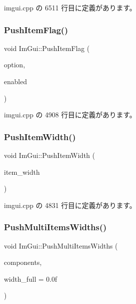  imgui.\+cpp の 6511 行目に定義があります。

\mbox{\label{namespace_im_gui_ac7301f6378333f6d17f47823eed9e00a}} 
\subsubsection{\texorpdfstring{Push\+Item\+Flag()}{PushItemFlag()}}
{\footnotesize\ttfamily void Im\+Gui\+::\+Push\+Item\+Flag (\begin{DoxyParamCaption}\item[{\mbox{\hyperlink{imgui__internal_8h_abcf9eafab4557e911b2c0d8fe2feeb38}{Im\+Gui\+Item\+Flags}}}]{option,  }\item[{bool}]{enabled }\end{DoxyParamCaption})}



 imgui.\+cpp の 4908 行目に定義があります。

\mbox{\label{namespace_im_gui_a4ad13bf38f0521a339133248ef3e3036}} 
\subsubsection{\texorpdfstring{Push\+Item\+Width()}{PushItemWidth()}}
{\footnotesize\ttfamily void Im\+Gui\+::\+Push\+Item\+Width (\begin{DoxyParamCaption}\item[{float}]{item\+\_\+width }\end{DoxyParamCaption})}



 imgui.\+cpp の 4831 行目に定義があります。

\mbox{\label{namespace_im_gui_ab913605fcf6d405d102cdf56cd414a5a}} 
\subsubsection{\texorpdfstring{Push\+Multi\+Items\+Widths()}{PushMultiItemsWidths()}}
{\footnotesize\ttfamily void Im\+Gui\+::\+Push\+Multi\+Items\+Widths (\begin{DoxyParamCaption}\item[{int}]{components,  }\item[{float}]{width\+\_\+full = {\ttfamily 0.0f} }\end{DoxyParamCaption})}



